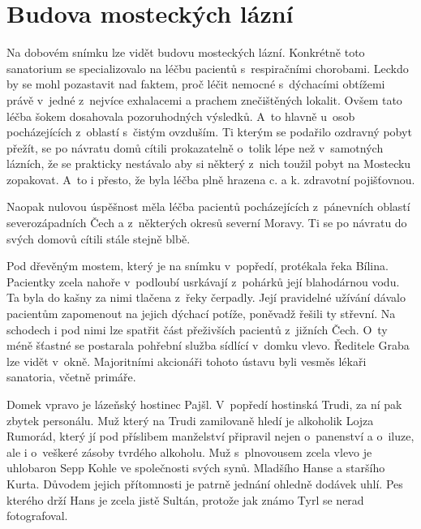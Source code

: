 
\chapter{Budova mosteckých lázní}

Na dobovém snímku lze vidět budovu mosteckých lázní. Konkrétně toto sanatorium
se specializovalo na léčbu pacientů s~respiračními chorobami. Leckdo by se mohl
pozastavit nad faktem, proč léčit nemocné s~dýchacími obtížemi právě v~jedné
z~nejvíce exhalacemi a prachem znečištěných lokalit. Ovšem tato léčba šokem
dosahovala pozoruhodných výsledků. A~to hlavně u~osob pocházejících z~oblastí
s~čistým ovzduším. Ti kterým se podařilo ozdravný pobyt přežít, se po návratu
domů cítili prokazatelně o~tolik lépe než v~samotných lázních, že se prakticky
nestávalo aby si některý z~nich toužil pobyt na Mostecku zopakovat. A~to i
přesto, že byla léčba plně hrazena c. a k. zdravotní pojišťovnou.

Naopak nulovou úspěšnost měla léčba pacientů pocházejících z~pánevních oblastí
severozápadních Čech a z~některých okresů severní Moravy. Ti se po návratu do
svých domovů cítili stále stejně blbě.

Pod dřevěným mostem, který je na snímku v~popředí, protékala řeka Bílina.
Pacientky zcela nahoře v~podloubí usrkávají z~pohárků její blahodárnou vodu. Ta
byla do kašny za nimi tlačena z~řeky čerpadly. Její pravidelné užívání dávalo
pacientům zapomenout na jejich dýchací potíže, poněvadž řešili ty střevní. Na
schodech i pod nimi lze spatřit část přeživších pacientů z~jižních Čech. O~ty
méně šťastné se postarala pohřební služba sídlící v~domku vlevo. Ředitele Graba
lze vidět v~okně. Majoritními akcionáři tohoto ústavu byli vesměs lékaři
sanatoria, včetně primáře.

Domek vpravo je lázeňský hostinec Pajšl. V~popředí hostinská Trudi, za ní pak
zbytek personálu. Muž který na Trudi zamilovaně hledí je alkoholik Lojza
Rumorád, který jí pod příslibem manželství připravil nejen o~panenství a
o~iluze, ale i o~veškeré zásoby tvrdého alkoholu. Muž s~plnovousem zcela vlevo
je uhlobaron Sepp Kohle ve společnosti svých synů. Mladšího Hanse a staršího
Kurta. Důvodem jejich přítomnosti je patrně jednání ohledně dodávek uhlí. Pes
kterého drží Hans je zcela jistě Sultán, protože jak známo Tyrl se nerad
fotografoval.

